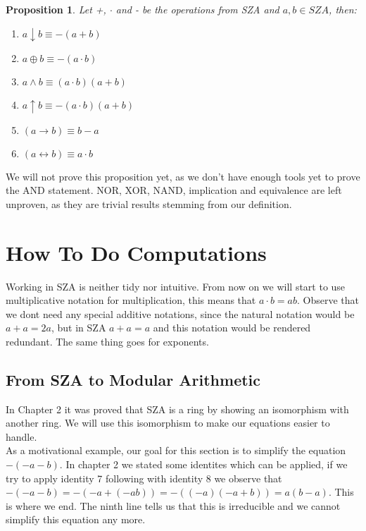 \documentclass[12pt]{report}
\newtheorem{proposition}{Proposition}[section]
\theoremstyle{definition}
\theoremstyle{remark}
\begin{document}
      \begin{proposition}
        Let +, $\cdot$ and - be the operations from SZA and $a,b\in SZA$, then:
        \begin{enumerate}
          \item $a\downarrow b\equiv -(a+b)$
          \item $a\oplus b\equiv -(a\cdot b)$
          \item $a\wedge b\equiv (a\cdot b)(a+b)$
          \item $a\uparrow b\equiv -(a\cdot b)(a+b)$
          \item $(a\rightarrow b)\equiv b-a$
          \item $(a\leftrightarrow b)\equiv a\cdot b$
        \end{enumerate}
      \end{proposition}

      We will not prove this proposition yet, as we don't have enough tools yet to prove the AND statement. NOR, XOR, NAND, implication and equivalence are left unproven, as they are trivial results stemming from our definition.

  \section{How To Do Computations}
    Working in SZA is neither tidy nor intuitive. From now on we will start to use multiplicative notation for multiplication, this means that $a\cdot b = ab$. Observe that we dont need any special additive notations, since the natural notation would be $a+a=2a$, but in SZA $a+a=a$ and this notation would be rendered redundant. The same thing goes for exponents.
    \subsection{From SZA to Modular Arithmetic}
      In Chapter 2 it was proved that SZA is a ring by showing an isomorphism with another ring. We will use this isomorphism to make our equations easier to handle.\\

      As a motivational example, our goal for this section is to simplify the equation $-(-a-b)$. In chapter 2 we stated some identites which can be applied, if we try to apply identity 7 following with identity 8 we observe that  $-(-a-b)=-(-a+(-ab))=-((-a)(-a+b))=a(b-a)$. This is where we end. The ninth line tells us that this is irreducible and we cannot simplify this equation any more.\\
\end{document}
